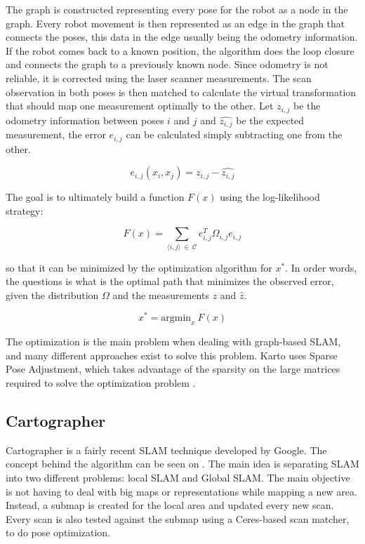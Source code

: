 The graph is constructed representing every pose for the robot as a node in the graph. Every robot movement is then represented as an edge in the graph that connects the poses, this data in the edge usually being the odometry information. If the robot comes back to a known position, the algorithm does the loop closure and connects the graph to a previously known node. Since odometry is not reliable, it is corrected using the laser scanner measurements. The scan observation in both poses is then matched to calculate the virtual transformation that should map one measurement optimally to the other. Let $z_{i,j}$ be the odometry information between poses $i$ and $j$ and $\hat{z_{i,j}}$ be the expected measurement, the error $e_{i,j}$ can be calculated simply subtracting one from the other.

\begin{equation}
    e_{i,j}(x_i, x_j) = z_{i,j} - \hat{z_{i,j}}
\end{equation}

The goal is to ultimately build a function $F(x)$ using the log-likelihood strategy:

\begin{equation}
    F(x) = \sum_{\langle i, j \rangle \ \in \ \mathcal{C}} e_{i,j}^T \Omega_{i,j} e_{i,j}
\end{equation}

so that it can be minimized by the optimization algorithm for $x^*$. In order words, the questions is what is the optimal path that minimizes the observed error, given the distribution $\Omega$ and the measurements $z$ and $\hat{z}$.

\begin{equation}
    x^* = \text{argmin}_x \ F(x)
\end{equation}

The optimization is the main problem when dealing with graph-based SLAM, and many different approaches exist to solve this problem. Karto uses Sparse Pose Adjustment, which takes advantage of the sparsity on the large matrices required to solve the optimization problem \cite{konolige2010efficient}.

\subsection{Cartographer}

Cartographer is a fairly recent SLAM technique developed by Google. The concept behind the algorithm can be seen on . The main idea is separating SLAM into two different problems: local SLAM and Global SLAM. The main objective is not having to deal with big maps or representations while mapping a new area. Instead, a submap is created for the local area and updated every new scan. Every scan is also tested against the submap using a Ceres-based scan matcher, to do pose optimization.


